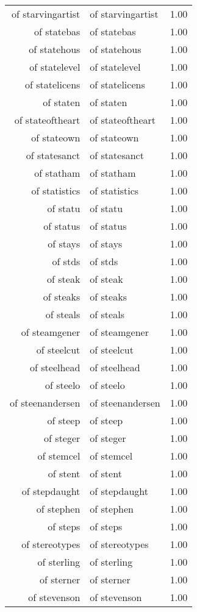 \begin{table}[ht]
\begin{tabular}{rlr}
  of starvingartist & of starvingartist & 1.00 \\ 
  of statebas & of statebas & 1.00 \\ 
  of statehous & of statehous & 1.00 \\ 
  of statelevel & of statelevel & 1.00 \\ 
  of statelicens & of statelicens & 1.00 \\ 
  of staten & of staten & 1.00 \\ 
  of stateoftheart & of stateoftheart & 1.00 \\ 
  of stateown & of stateown & 1.00 \\ 
  of statesanct & of statesanct & 1.00 \\ 
  of statham & of statham & 1.00 \\ 
  of statistics & of statistics & 1.00 \\ 
  of statu & of statu & 1.00 \\ 
  of status & of status & 1.00 \\ 
  of stays & of stays & 1.00 \\ 
  of stds & of stds & 1.00 \\ 
  of steak & of steak & 1.00 \\ 
  of steaks & of steaks & 1.00 \\ 
  of steals & of steals & 1.00 \\ 
  of steamgener & of steamgener & 1.00 \\ 
  of steelcut & of steelcut & 1.00 \\ 
  of steelhead & of steelhead & 1.00 \\ 
  of steelo & of steelo & 1.00 \\ 
  of steenandersen & of steenandersen & 1.00 \\ 
  of steep & of steep & 1.00 \\ 
  of steger & of steger & 1.00 \\ 
  of stemcel & of stemcel & 1.00 \\ 
  of stent & of stent & 1.00 \\ 
  of stepdaught & of stepdaught & 1.00 \\ 
  of stephen & of stephen & 1.00 \\ 
  of steps & of steps & 1.00 \\ 
  of stereotypes & of stereotypes & 1.00 \\ 
  of sterling & of sterling & 1.00 \\ 
  of sterner & of sterner & 1.00 \\ 
  of stevenson & of stevenson & 1.00 \\ 

\end{tabular}
\end{table}
